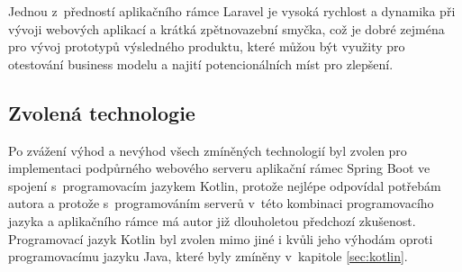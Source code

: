 Jednou z~předností aplikačního rámce Laravel je vysoká rychlost a dynamika při vývoji webových aplikací a krátká zpětnovazební smyčka, což je dobré zejména pro vývoj prototypů výsledného produktu, které můžou být využity pro otestování business modelu a najití potencionálních míst pro zlepšení.

\subsection{Zvolená technologie}

Po zvážení výhod a nevýhod všech zmíněných technologií byl zvolen pro implementaci podpůrného webového serveru aplikační rámec Spring Boot ve spojení s~programovacím jazykem Kotlin, protože nejlépe odpovídal potřebám autora a protože s~programováním serverů v~této kombinaci programovacího jazyka a aplikačního rámce má autor již dlouholetou předchozí zkušenost. Programovací jazyk Kotlin byl zvolen mimo jiné i kvůli jeho výhodám oproti programovacímu jazyku Java, které byly zmíněny v~kapitole \ref{sec:kotlin}.